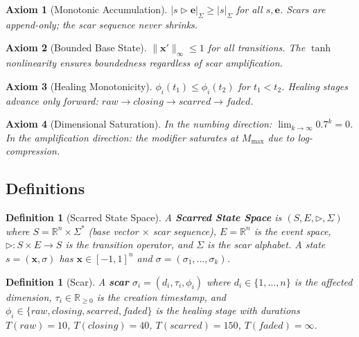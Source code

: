 \documentclass[11pt]{article}
\newtheorem{definition}[theorem]{Definition}
\newtheorem{axiom}{Axiom}[section]
\begin{document}
\begin{axiom}[Monotonic Accumulation]
\label{ax:scar-mono}
$|s \triangleright \mathbf{e}|_\Sigma \geq |s|_\Sigma$ for all $s, \mathbf{e}$. Scars are append-only; the scar sequence never shrinks.
\end{axiom}

\begin{axiom}[Bounded Base State]
\label{ax:scar-bounded}
$\|\mathbf{x}'\|_\infty \leq 1$ for all transitions. The $\tanh$ nonlinearity ensures boundedness regardless of scar amplification.
\end{axiom}

\begin{axiom}[Healing Monotonicity]
\label{ax:scar-heal}
$\phi_i(t_1) \leq \phi_i(t_2)$ for $t_1 < t_2$. Healing stages advance only forward: $raw \to closing \to scarred \to faded$.
\end{axiom}

\begin{axiom}[Dimensional Saturation]
\label{ax:scar-sat}
In the numbing direction: $\lim_{k \to \infty} 0.7^k = 0$. In the amplification direction: the modifier saturates at $M_{\max}$ due to log-compression.
\end{axiom}

\subsection{Definitions}

\begin{definition}[Scarred State Space]
A \textbf{Scarred State Space} is $(S, E, \triangleright, \Sigma)$ where $S = \mathbb{R}^n \times \Sigma^*$ (base vector $\times$ scar sequence), $E = \mathbb{R}^n$ is the event space, $\triangleright: S \times E \to S$ is the transition operator, and $\Sigma$ is the scar alphabet. A state $s = (\mathbf{x}, \sigma)$ has $\mathbf{x} \in [-1,1]^n$ and $\sigma = (\sigma_1, \ldots, \sigma_k)$.
\end{definition}

\begin{definition}[Scar]
A \textbf{scar} $\sigma_i = (d_i, \tau_i, \phi_i)$ where $d_i \in \{1,\ldots,n\}$ is the affected dimension, $\tau_i \in \mathbb{R}_{\geq 0}$ is the creation timestamp, and $\phi_i \in \{raw, closing, scarred, faded\}$ is the healing stage with durations $T(raw)=10$, $T(closing)=40$, $T(scarred)=150$, $T(faded)=\infty$.
\end{definition}
\end{document}
